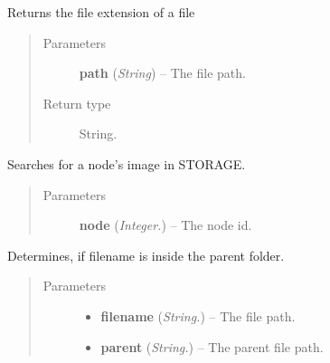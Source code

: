 \documentclass[letterpaper,10pt,english]{sphinxmanual}
\begin{document}
\begin{fulllineitems}
\label{api:filesystem.GetFileExtension}
Returns the file extension of a file
\begin{quote}\begin{description}
\item[{Parameters}] \leavevmode
\textbf{path} (\emph{String}) -- The file path.

\item[{Return type}] \leavevmode
String.

\end{description}\end{quote}

\end{fulllineitems}


\begin{fulllineitems}
\label{api:filesystem.GetNodeImg}
Searches for a node's image in STORAGE.
\begin{quote}\begin{description}
\item[{Parameters}] \leavevmode
\textbf{node} (\emph{Integer.}) -- The node id.

\end{description}\end{quote}

\end{fulllineitems}


\begin{fulllineitems}
\label{api:filesystem.IsSubtree}
Determines, if filename is inside the parent folder.
\begin{quote}\begin{description}
\item[{Parameters}] \leavevmode\begin{itemize}
\item {} 
\textbf{filename} (\emph{String.}) -- The file path.

\item {} 
\textbf{parent} (\emph{String.}) -- The parent file path.

\end{itemize}

\end{description}\end{quote}

\end{fulllineitems}
\end{document}
